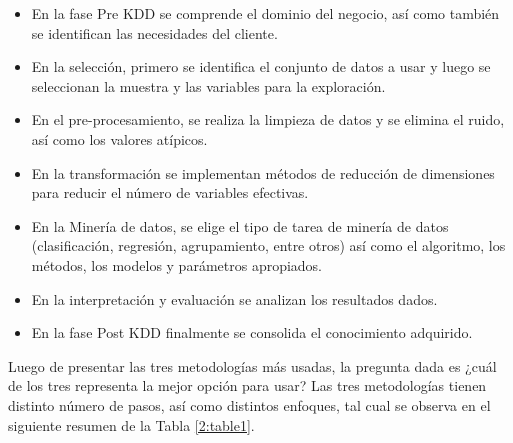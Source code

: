 \begin{itemize}
	\begin{itemize}
		\item En la fase Pre KDD se comprende el dominio del negocio, así como también se identifican las necesidades del cliente.
		\item En la selección, primero se identifica el conjunto de datos a usar y luego se seleccionan la muestra y las variables para la exploración.
		\item En el pre-procesamiento, se realiza la limpieza de datos y se elimina el ruido, así como los valores atípicos.
		\item En la transformación se implementan métodos de reducción de dimensiones para reducir el número de variables efectivas.
		\item En la Minería de datos, se elige el tipo de tarea de minería de datos (clasificación, regresión, agrupamiento, entre otros) así como el algoritmo, los métodos, los modelos y parámetros apropiados.
		\item En la interpretación y evaluación se analizan los resultados dados.
		\item En la fase Post KDD finalmente se consolida el conocimiento adquirido.
	\end{itemize}

\end{itemize}

Luego de presentar las tres metodologías más usadas, la pregunta dada es ¿cuál de los tres representa la mejor opción para usar?
Las tres metodologías tienen distinto número de pasos, así como distintos enfoques, tal cual se observa en el siguiente resumen de la Tabla \ref{2:table1}.

